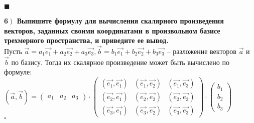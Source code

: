 \documentclass[a4paper,12pt]{article}
\begin{document}
\begin{flushright}
	$\blacksquare$
\end{flushright}
\textbf{6$\left.\right)$ Выпишите формулу для вычисления скалярного произведения векторов, заданных своими координатами в произвольном базисе трехмерного пространства, и приведите ее вывод.}\\Пусть $\overrightarrow{a}=a_1\overrightarrow{e_1}+a_2\overrightarrow{e_2}+a_3\overrightarrow{e_3}, \overrightarrow{b}=b_1\overrightarrow{e_1}+b_2\overrightarrow{e_2}+b_3\overrightarrow{e_3}$ -- разложение векторов $\overrightarrow{a}$ и $\overrightarrow{b}$ по базису. Тогда их скалярное произведение может быть вычислено по формуле: \\$(\overrightarrow{a}, \overrightarrow{b})=\begin{pmatrix}
a_1&a_2&a_3
\end{pmatrix}\cdot\begin{pmatrix}
(\overrightarrow{e_1}, \overrightarrow{e_1})&(\overrightarrow{e_1}, \overrightarrow{e_2})&(\overrightarrow{e_1},\overrightarrow{e_3})\\
(\overrightarrow{e_2}, \overrightarrow{e_1})&(\overrightarrow{e_2}, \overrightarrow{e_2})&(\overrightarrow{e_2},\overrightarrow{e_3})\\
(\overrightarrow{e_3}, \overrightarrow{e_1})&(\overrightarrow{e_3}, \overrightarrow{e_2})&(\overrightarrow{e_3},\overrightarrow{e_3})
\end{pmatrix}\cdot\begin{pmatrix}
b_1\\
b_2\\
b_3
\end{pmatrix}$\\
$\square$\\
\end{document}

